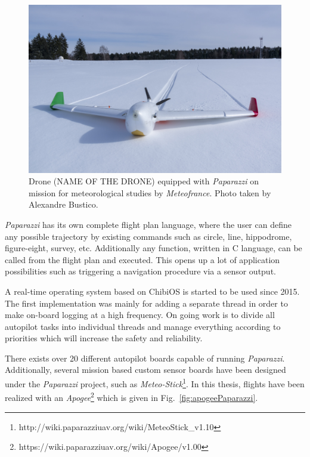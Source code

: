 \begin{figure}
\begin{center}
\includegraphics[width=13cm]{figures/snowWhiteJPG}
\caption{Drone (NAME OF THE DRONE) equipped with \emph{Paparazzi} on mission for meteorological studies by \emph{Meteofrance}. Photo taken by Alexandre Bustico.} 
\label{fig:snowWhite}
\end{center}
\end{figure}


\emph{Paparazzi} has its own complete flight plan language, where the user can define any possible trajectory by existing commands such as circle, line, hippodrome, figure-eight, survey, etc. 
Additionally any function, written in C language, can be called from the flight plan and executed. 
This opens up a lot of application possibilities such as triggering a navigation procedure via a sensor output.

A real-time operating system based on ChibiOS is started to be used since 2015. 
The first implementation was mainly for adding a separate thread in order to make on-board logging at a high frequency. 
On going work is to divide all autopilot tasks into individual threads and manage everything according to priorities which will increase the safety and reliability.


There exists over 20 different autopilot boards capable of running \emph{Paparazzi}. Additionally, several mission based custom sensor boards have been designed under the \emph{Paparazzi} project, such as \emph{Meteo-Stick}\footnote{http://wiki.paparazziuav.org/wiki/MeteoStick\_v1.10}. 
In this thesis, flights have been realized with an \emph{Apogee}\footnote{https://wiki.paparazziuav.org/wiki/Apogee/v1.00} which is given in Fig.~\ref{fig:apogeePaparazzi}.


